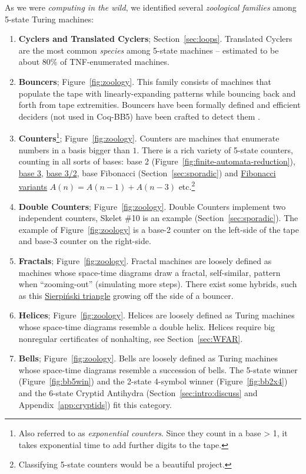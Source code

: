 \documentclass[letterpaper,british,11pt]{article}
\theoremstyle{definition} %
\numberwithin{equation}{section}
\theoremstyle{definition} %
\newcommand{\CoqBB}{Coq-BB5\xspace}
\begin{document}
As we were \textit{computing in the wild}, we identified several \textit{zoological families} among 5-state Turing machines:

\begin{enumerate}
    \item \textbf{Cyclers and Translated Cyclers}; Section~\ref{sec:loops}. Translated Cyclers are the most common \textit{species} among 5-state machines -- estimated to be about 80\% of TNF-enumerated machines.
    \item \textbf{Bouncers}; Figure~\ref{fig:zoology}. This family consists of machines that populate the tape with linearly-expanding patterns while bouncing back and forth from tape extremities. Bouncers have been formally defined and efficient deciders (not used in \CoqBB) have been crafted to detect them \cite{bbchallenge_part1}.
    \item \textbf{Counters}\footnote{Also referred to as \textit{exponential counters}. Since they count in a base > 1, it takes exponential time to add further digits to the tape.}; Figure~\ref{fig:zoology}. Counters are machines that enumerate numbers in a basis bigger than $1$. There is a rich variety of 5-state counters, counting in all sorts of bases: base 2 (Figure~\ref{fig:finite-automata-reduction}), \href{https://bbchallenge.org/1RB1RB_1RC0LD_1LD1RA_---1LE_0RA0LE }{base 3}, \href{https://bbchallenge.org/1LB1RC_0LE0RA_1LD1RA_0RA1LB_0RD0LB}{base 3/2}, base Fibonacci (Section~\ref{sec:sporadic}) and \href{https://bbchallenge.org/1RB1RA_0LC1LC_0RD1LD_0RA0LB}{Fibonacci variants} $A(n) = A(n-1) + A(n-3)$ etc.\footnote{Classifying 5-state counters would be a beautiful project.}
    \item \textbf{Double Counters}; Figure~\ref{fig:zoology}. Double Counters implement two independent counters, Skelet \#10 is an example (Section~\ref{sec:sporadic}). The example of Figure~\ref{fig:zoology} is a base-2 counter on the left-side of the tape and base-3 counter on the right-side.
    \item \textbf{Fractals}; Figure~\ref{fig:zoology}. Fractal machines are loosely defined as machines whose space-time diagrams draw a fractal, self-similar, pattern when ``zooming-out'' (\ie simulating more steps). There exist some hybrids, such as this \href{https://bbchallenge.org/1RB1RC_1RC1RB_1LD0RA_---1LE_0LD0LA&s=20000}{Sierpiński triangle} growing off the side of a bouncer.
    \item \textbf{Helices}; Figure~\ref{fig:zoology}. Helices are loosely defined as Turing machines whose space-time diagrams resemble a double helix. Helices require big nonregular certificates of nonhalting, see Section~\ref{sec:WFAR}.
    \item \textbf{Bells}; Figure~\ref{fig:zoology}. Bells are loosely defined as Turing machines whose space-time diagrams resemble a succession of bells. The 5-state winner (Figure~\ref{fig:bb5win}) and the 2-state 4-symbol winner (Figure~\ref{fig:bb2x4}) and the 6-state Cryptid Antihydra (Section~\ref{sec:intro:discuss} and Appendix~\ref{app:cryptids}) fit this category.
\end{enumerate}
\end{document}
